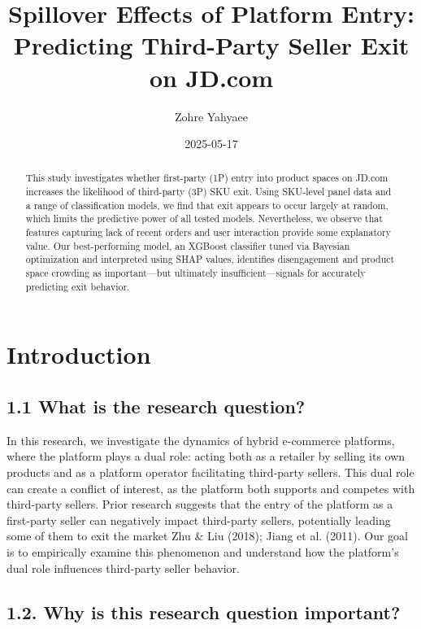 \documentclass[
  letterpaper,
  DIV=11,
  numbers=noendperiod]{scrartcl}
\title{Spillover Effects of Platform Entry: Predicting Third-Party
Seller Exit on JD.com}
\author{Zohre Yahyaee}
\date{2025-05-17}
\begin{document}
\maketitle
\begin{abstract}
This study investigates whether first-party (1P) entry into product
spaces on JD.com increases the likelihood of third-party (3P) SKU exit.
Using SKU-level panel data and a range of classification models, we find
that exit appears to occur largely at random, which limits the
predictive power of all tested models. Nevertheless, we observe that
features capturing lack of recent orders and user interaction provide
some explanatory value. Our best-performing model, an XGBoost classifier
tuned via Bayesian optimization and interpreted using SHAP values,
identifies disengagement and product space crowding as important---but
ultimately insufficient---signals for accurately predicting exit
behavior.
\end{abstract}


\section{Introduction}\label{introduction}

\subsection{1.1 What is the research
question?}\label{what-is-the-research-question}

In this research, we investigate the dynamics of hybrid e-commerce
platforms, where the platform plays a dual role: acting both as a
retailer by selling its own products and as a platform operator
facilitating third-party sellers. This dual role can create a conflict
of interest, as the platform both supports and competes with third-party
sellers. Prior research suggests that the entry of the platform as a
first-party seller can negatively impact third-party sellers,
potentially leading some of them to exit the market Zhu \& Liu (2018);
Jiang et al. (2011). Our goal is to empirically examine this phenomenon
and understand how the platform's dual role influences third-party
seller behavior.

\subsection{1.2. Why is this research question
important?}\label{why-is-this-research-question-important}
\end{document}
